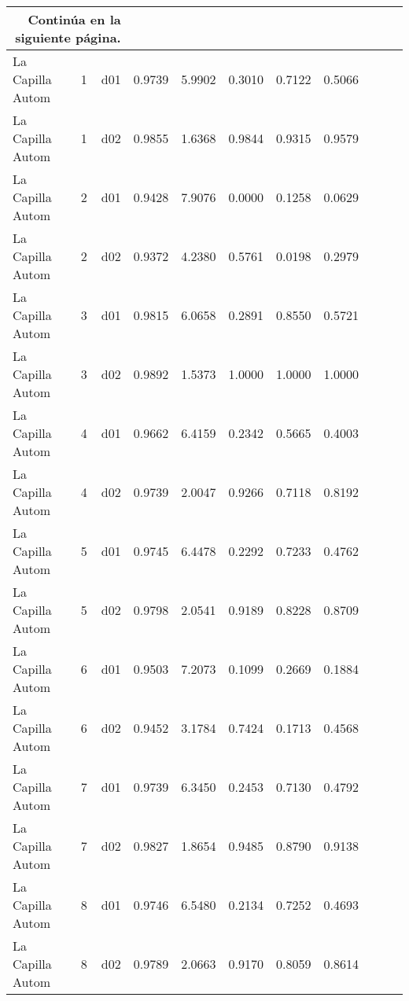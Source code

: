 \begin{landscape}
\begin{longtable}{p{2cm}rrrrrrrrrr}
\midrule
\endhead
\midrule
\multicolumn{3}{r}{{Continúa en la siguiente página.}} \\
\midrule
\endfoot

\bottomrule
\endlastfoot

     La Capilla Autom  &          1 &     d01 &   0.9739 &  5.9902 &        0.3010 &           0.7122 &  0.5066 \\
     La Capilla Autom  &          1 &     d02 &   0.9855 &  1.6368 &        0.9844 &           0.9315 &  0.9579 \\
     La Capilla Autom  &          2 &     d01 &   0.9428 &  7.9076 &        0.0000 &           0.1258 &  0.0629 \\
     La Capilla Autom  &          2 &     d02 &   0.9372 &  4.2380 &        0.5761 &           0.0198 &  0.2979 \\
     La Capilla Autom  &          3 &     d01 &   0.9815 &  6.0658 &        0.2891 &           0.8550 &  0.5721 \\
     La Capilla Autom  &          3 &     d02 &   0.9892 &  1.5373 &        1.0000 &           1.0000 &  1.0000 \\
     La Capilla Autom  &          4 &     d01 &   0.9662 &  6.4159 &        0.2342 &           0.5665 &  0.4003 \\
     La Capilla Autom  &          4 &     d02 &   0.9739 &  2.0047 &        0.9266 &           0.7118 &  0.8192 \\
     La Capilla Autom  &          5 &     d01 &   0.9745 &  6.4478 &        0.2292 &           0.7233 &  0.4762 \\
     La Capilla Autom  &          5 &     d02 &   0.9798 &  2.0541 &        0.9189 &           0.8228 &  0.8709 \\
     La Capilla Autom  &          6 &     d01 &   0.9503 &  7.2073 &        0.1099 &           0.2669 &  0.1884 \\
     La Capilla Autom  &          6 &     d02 &   0.9452 &  3.1784 &        0.7424 &           0.1713 &  0.4568 \\
     La Capilla Autom  &          7 &     d01 &   0.9739 &  6.3450 &        0.2453 &           0.7130 &  0.4792 \\
     La Capilla Autom  &          7 &     d02 &   0.9827 &  1.8654 &        0.9485 &           0.8790 &  0.9138 \\
     La Capilla Autom  &          8 &     d01 &   0.9746 &  6.5480 &        0.2134 &           0.7252 &  0.4693 \\
     La Capilla Autom  &          8 &     d02 &   0.9789 &  2.0663 &        0.9170 &           0.8059 &  0.8614 \\

\end{longtable}
\end{landscape}
